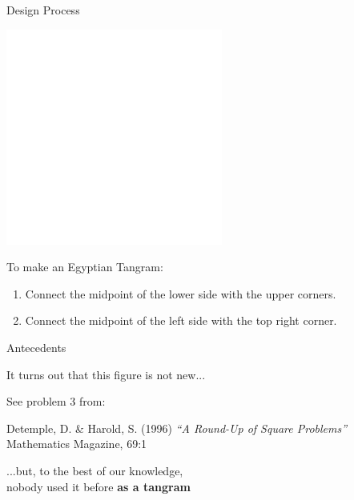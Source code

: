 \documentclass[14pt]{beamer}
\begin{document}
    \begin{frame}{Design Process}
        \begin{center}
            \includegraphics[height=18ex]{figures/figure001b.pdf}
        \end{center}

        To make an Egyptian Tangram:

        {\small \begin{enumerate}
            \item Connect the midpoint of the lower side with the upper corners.
            \item Connect the midpoint of the left side with the top right corner.
        \end{enumerate}}
    \end{frame}


    \begin{frame}{Antecedents}
        \begin{center}
            It turns out that this figure is not new...

            \bigskip \bigskip \bigskip

            {\small See problem 3 from:}

            \medskip

            {\footnotesize Detemple, D. \& Harold, S. (1996) \emph{``A Round-Up of Square Problems''} Mathematics Magazine, 69:1}

            \bigskip \bigskip \bigskip

            ...but, to the best of our knowledge,\\nobody used it before \textbf{as a tangram}
        \end{center}
    \end{frame}

\end{document}
